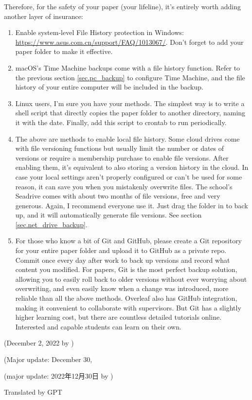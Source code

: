Therefore, for the safety of your paper (your lifeline), it's entirely worth adding another layer of insurance:

\begin{enumerate}
    \item Enable system-level File History protection in Windows: \url{https://www.asus.com.cn/support/FAQ/1013067/}. Don't forget to add your paper folder to make it effective.
    \item macOS's Time Machine backups come with a file history function. Refer to the previous section \ref{sec.pc_backup} to configure Time Machine, and the file history of your entire computer will be included in the backup.
    \item Linux users, I'm sure you have your methods. The simplest way is to write a shell script that directly copies the paper folder to another directory, naming it with the date. Finally, add this script to crontab to run periodically.
    \item The above are methods to enable local file history. Some cloud drives come with file versioning functions but usually limit the number or dates of versions or require a membership purchase to enable file versions. After enabling them, it's equivalent to also storing a version history in the cloud. In case your local settings aren't properly configured or can't be used for some reason, it can save you when you mistakenly overwrite files. The school's Seadrive comes with about two months of file versions, free and very generous. Again, I recommend everyone use it. Just drag the folder in to back up, and it will automatically generate file versions. See section \ref{sec.net_drive_backup}.
    \item For those who know a bit of Git and GitHub, please create a Git repository for your entire paper folder and upload it to GitHub as a private repo. Commit once every day after work to back up versions and record what content you modified. For papers, Git is the most perfect backup solution, allowing you to easily roll back to older versions without ever worrying about overwriting, and even easily know when a change was introduced, more reliable than all the above methods. Overleaf also has GitHub integration, making it convenient to collaborate with supervisors. But Git has a slightly higher learning cost, but there are countless detailed tutorials online. Interested and capable students can learn on their own.
\end{enumerate}

\begin{flushright}
    (December 2, 2022 by \Wu)

    (Major update: December 30,

    (major update: 2022年12月30日 by \Wu)

    Translated by GPT
\end{flushright}

